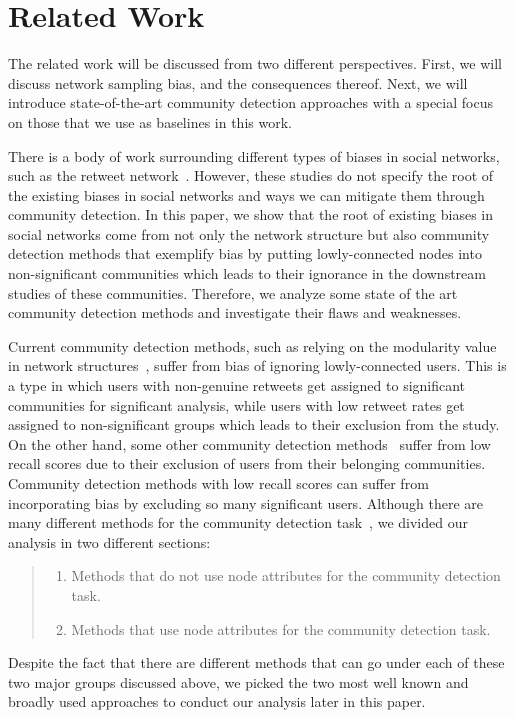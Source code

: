 \vspace{-1pt}
\section{Related Work}
The related work will be discussed from two different perspectives. First, we will discuss network sampling bias, and the consequences thereof. Next, we will introduce state-of-the-art community detection approaches with a special focus on those that we use as baselines in this work.

There is a body of work surrounding different types of biases in social networks, such as the retweet network~\cite{Diaz:2018:AAB:3173574.3173986,Liao:2016:SUB:2858036.2858422}. However, these studies do not specify the root of the existing biases in social networks and ways we can mitigate them through community detection. In this paper, we show that the root of existing biases in social networks come from not only the network structure but also community detection methods that exemplify bias by putting lowly-connected nodes into non-significant communities which leads to their ignorance in the downstream studies of these communities. Therefore, we analyze some state of the art community detection methods and investigate their flaws and weaknesses. 

Current community detection methods, such as relying on the modularity value in network structures~\cite{blondel2008fast}, suffer from bias of ignoring lowly-connected users. 
This is a type in which users with non-genuine retweets get assigned to significant communities for significant analysis, while users with low retweet rates get assigned to non-significant groups which leads to their exclusion from the study. On the other hand, some other community detection methods~\cite{6729613} suffer from low recall scores due to their exclusion of users from their belonging communities. Community detection methods with low recall scores can suffer from incorporating bias by excluding so many significant users. Although there are many different methods for the community detection task~\cite{Papadopoulos2012,gargi2011large}, we divided our analysis in two different sections: 
\begin{quote}
\begin{enumerate}
\item Methods that do not use node attributes for the community detection task.
\item Methods that use node attributes for the community detection task.
\end{enumerate}
\end{quote}
Despite the fact that there are different methods that can go under each of these two major groups discussed above, we picked the two most well known and broadly used approaches to conduct our analysis later in this paper.

